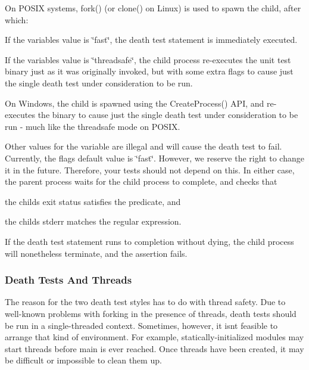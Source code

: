 \begin{DoxyItemize}
\item On P\+O\+S\+IX systems, {\ttfamily fork()} (or {\ttfamily clone()} on Linux) is used to spawn the child, after which\+:
\begin{DoxyItemize}
\item If the variable\textquotesingle{}s value is {\ttfamily \char`\"{}fast\char`\"{}}, the death test statement is immediately executed.
\item If the variable\textquotesingle{}s value is {\ttfamily \char`\"{}threadsafe\char`\"{}}, the child process re-\/executes the unit test binary just as it was originally invoked, but with some extra flags to cause just the single death test under consideration to be run.
\end{DoxyItemize}
\item On Windows, the child is spawned using the {\ttfamily Create\+Process()} A\+PI, and re-\/executes the binary to cause just the single death test under consideration to be run -\/ much like the {\ttfamily threadsafe} mode on P\+O\+S\+IX.
\end{DoxyItemize}

Other values for the variable are illegal and will cause the death test to fail. Currently, the flag\textquotesingle{}s default value is \char`\"{}fast\char`\"{}. However, we reserve the right to change it in the future. Therefore, your tests should not depend on this. In either case, the parent process waits for the child process to complete, and checks that


\begin{DoxyEnumerate}
\item the child\textquotesingle{}s exit status satisfies the predicate, and
\item the child\textquotesingle{}s stderr matches the regular expression.
\end{DoxyEnumerate}

If the death test statement runs to completion without dying, the child process will nonetheless terminate, and the assertion fails.

\subsubsection*{Death Tests And Threads}

The reason for the two death test styles has to do with thread safety. Due to well-\/known problems with forking in the presence of threads, death tests should be run in a single-\/threaded context. Sometimes, however, it isn\textquotesingle{}t feasible to arrange that kind of environment. For example, statically-\/initialized modules may start threads before main is ever reached. Once threads have been created, it may be difficult or impossible to clean them up.

